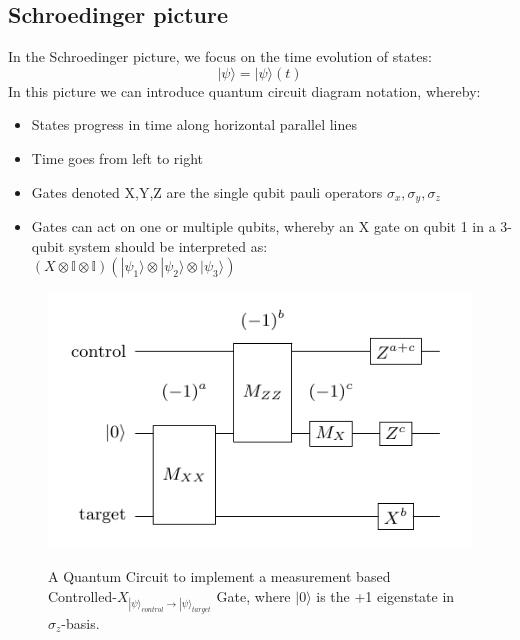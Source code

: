 \subsection{Schroedinger picture}
In the Schroedinger picture, we focus on the time evolution of states:
\begin{equation}  
	|\psi\rangle = |\psi\rangle(t) 
\end{equation}
In this picture we can introduce quantum circuit diagram notation, whereby:
\begin{itemize}
	\item States progress in time along horizontal parallel lines
	\item Time goes from left to right
	\item Gates denoted X,Y,Z are the single qubit pauli operators
		$\sigma_x,\sigma_y,\sigma_z$
	\item Gates can act on one or multiple qubits, whereby an X gate 
		on qubit 1 in a 3-qubit system should be interpreted as:
		\\$(X\otimes \mathbb{I} \otimes \mathbb{I}) (|\psi_1\rangle
		\otimes |\psi_2\rangle \otimes |\psi_3\rangle)$
\end{itemize}
\begin{figure}[h!]
	\begin{center}
\includegraphics[scale=0.5]{img/cnotMeasureCircuit.png}\\
	\caption{A Quantum Circuit to implement a measurement based\\
		Controlled-$X_{|\psi\rangle_{control}\rightarrow |\psi\rangle_{target}}$ Gate,
		where $|0\rangle$ is the +1 eigenstate in $\sigma_{z}$-basis.}
	\label{fig:circuit1}
	\end{center}
\end{figure}
\newpage

